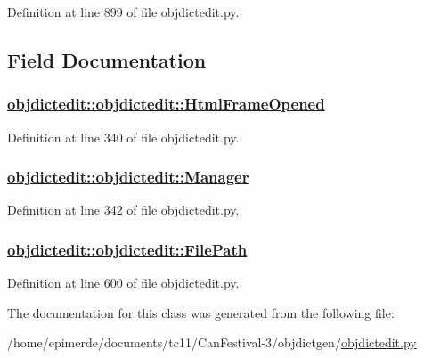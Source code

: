 Definition at line 899 of file objdictedit.py.

\subsection{Field Documentation}
\hypertarget{classobjdictedit_1_1objdictedit_e3ce93c9ed275bf17437c681d5ad9692}{
\subsubsection[HtmlFrameOpened]{\setlength{\rightskip}{0pt plus 5cm}\hyperlink{classobjdictedit_1_1objdictedit_e3ce93c9ed275bf17437c681d5ad9692}{objdictedit::objdictedit::Html\-Frame\-Opened}}}
\label{classobjdictedit_1_1objdictedit_e3ce93c9ed275bf17437c681d5ad9692}




Definition at line 340 of file objdictedit.py.\hypertarget{classobjdictedit_1_1objdictedit_6ccd1cd8d15a57827a655e8e556550aa}{
\subsubsection[Manager]{\setlength{\rightskip}{0pt plus 5cm}\hyperlink{classobjdictedit_1_1objdictedit_6ccd1cd8d15a57827a655e8e556550aa}{objdictedit::objdictedit::Manager}}}
\label{classobjdictedit_1_1objdictedit_6ccd1cd8d15a57827a655e8e556550aa}




Definition at line 342 of file objdictedit.py.\hypertarget{classobjdictedit_1_1objdictedit_d412cf4192d971441e15328fe07d0836}{
\subsubsection[FilePath]{\setlength{\rightskip}{0pt plus 5cm}\hyperlink{classobjdictedit_1_1objdictedit_d412cf4192d971441e15328fe07d0836}{objdictedit::objdictedit::File\-Path}}}
\label{classobjdictedit_1_1objdictedit_d412cf4192d971441e15328fe07d0836}




Definition at line 600 of file objdictedit.py.

The documentation for this class was generated from the following file:\begin{CompactItemize}
\item 
/home/epimerde/documents/tc11/Can\-Festival-3/objdictgen/\hyperlink{objdictedit_8py}{objdictedit.py}\end{CompactItemize}
